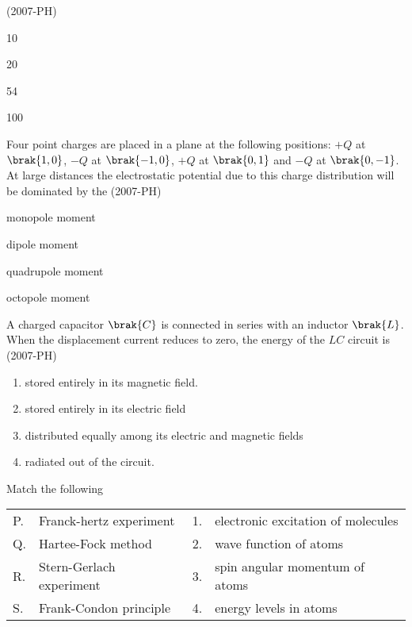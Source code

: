     \hfill (2007-PH)
    \begin{enumerate}
        \begin{multicols}{2}
            \item 10
            \item 20
            \item 54
            \item 100
        \end{multicols}
    \end{enumerate}
    \item Four point charges are placed in a plane at the following positions: $+Q$ at $\brak{1,0}$, $-Q$ at $\brak{-1,0}$, $+Q$ at $\brak{0,1}$ and $-Q$ at $\brak{0,-1}$. At large distances the electrostatic potential due to this charge distribution will be dominated by the \hfill (2007-PH)
    \begin{enumerate}
        \begin{multicols}{2}
            \item monopole moment 
            \item dipole moment 
            \item quadrupole moment 
            \item octopole moment 
        \end{multicols}
    \end{enumerate}
    \item A charged capacitor $\brak{C}$ is connected in series with an inductor $\brak{L}$. When the displacement current reduces to zero, the energy of the $LC$ circuit is \hfill (2007-PH)
    \begin{enumerate}
            \item stored entirely in its magnetic field.
            \item stored entirely in its electric field
            \item distributed equally among its electric and magnetic fields
            \item radiated out of the circuit.
    \end{enumerate}
    \item Match the following 
    \begin{table}[!h]
        \centering
        \begin{tabular}{p{0.1cm}  p{4cm} p{0.1cm} p{13cm}}
     P.& Franck-hertz experiment& 1. & electronic excitation of molecules  \\
     Q. & Hartee-Fock method & 2. & wave function of atoms  \\
     R. & Stern-Gerlach experiment & 3. & spin angular momentum of atoms \\
     S.& Frank-Condon principle & 4. & energy levels in atoms
\end{tabular}

    \end{table} 
    

